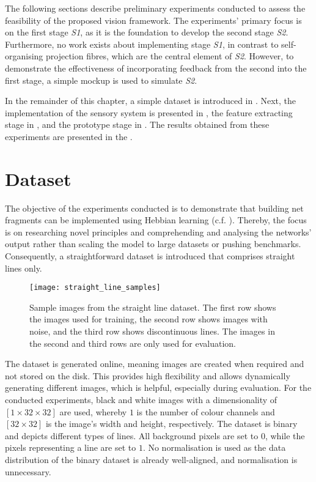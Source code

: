 The following sections describe preliminary experiments conducted to assess the feasibility of the proposed vision framework.
The experiments' primary focus is on the first stage \emph{S1}, as it is the foundation to develop the second stage \emph{S2}. Furthermore, no work exists about implementing stage \emph{S1}, in contrast to self-organising projection fibres, which are the central element of \emph{S2}.
However, to demonstrate the effectiveness of incorporating feedback from the second into the first stage, a simple mockup is used to simulate \emph{S2}.

In the remainder of this chapter, a simple dataset is introduced in . Next, the implementation of the sensory system is presented in , the feature extracting stage in , and the prototype stage in . The results obtained from these experiments are presented in the .


\section{Dataset}
The objective of the experiments conducted is to demonstrate that building net fragments can be implemented using Hebbian learning  (c.f. ).
Thereby, the focus is on researching novel principles and comprehending and analysing the networks' output rather than scaling the model to large datasets or pushing benchmarks.
Consequently, a straightforward dataset is introduced that comprises straight lines only.


\begin{figure}[h]
    \centering
    \texttt{[image: straight\_line\_samples]}
    \caption[Sample images from the dataset]{Sample images from the straight line dataset. The first row shows the images used for training, the second row shows images with noise, and the third row shows discontinuous lines. The images in the second and third rows are only used for evaluation.}
\end{figure}


The dataset is generated online, meaning images are created when required and not stored on the disk. This provides high flexibility and allows dynamically generating different images, which is helpful, especially during evaluation.
For the conducted experiments, black and white images with a dimensionality of $[1 \times 32 \times 32]$ are used, whereby $1$ is the number of colour channels and $[32 \times 32]$ is the image's width and height, respectively.
The dataset is binary and depicts different types of lines.
All background pixels are set to $0$, while the pixels representing a line are set to $1$.
No normalisation is used as the data distribution of the binary dataset is already well-aligned, and normalisation is unnecessary.

